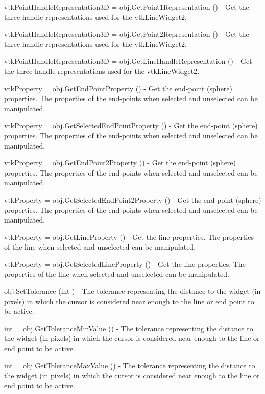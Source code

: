 \begin{DoxyItemize}
\item {\ttfamily vtk\-Point\-Handle\-Representation3\-D = obj.\-Get\-Point1\-Representation ()} -\/ Get the three handle representations used for the vtk\-Line\-Widget2.  
\item {\ttfamily vtk\-Point\-Handle\-Representation3\-D = obj.\-Get\-Point2\-Representation ()} -\/ Get the three handle representations used for the vtk\-Line\-Widget2.  
\item {\ttfamily vtk\-Point\-Handle\-Representation3\-D = obj.\-Get\-Line\-Handle\-Representation ()} -\/ Get the three handle representations used for the vtk\-Line\-Widget2.  
\item {\ttfamily vtk\-Property = obj.\-Get\-End\-Point\-Property ()} -\/ Get the end-\/point (sphere) properties. The properties of the end-\/points when selected and unselected can be manipulated.  
\item {\ttfamily vtk\-Property = obj.\-Get\-Selected\-End\-Point\-Property ()} -\/ Get the end-\/point (sphere) properties. The properties of the end-\/points when selected and unselected can be manipulated.  
\item {\ttfamily vtk\-Property = obj.\-Get\-End\-Point2\-Property ()} -\/ Get the end-\/point (sphere) properties. The properties of the end-\/points when selected and unselected can be manipulated.  
\item {\ttfamily vtk\-Property = obj.\-Get\-Selected\-End\-Point2\-Property ()} -\/ Get the end-\/point (sphere) properties. The properties of the end-\/points when selected and unselected can be manipulated.  
\item {\ttfamily vtk\-Property = obj.\-Get\-Line\-Property ()} -\/ Get the line properties. The properties of the line when selected and unselected can be manipulated.  
\item {\ttfamily vtk\-Property = obj.\-Get\-Selected\-Line\-Property ()} -\/ Get the line properties. The properties of the line when selected and unselected can be manipulated.  
\item {\ttfamily obj.\-Set\-Tolerance (int )} -\/ The tolerance representing the distance to the widget (in pixels) in which the cursor is considered near enough to the line or end point to be active.  
\item {\ttfamily int = obj.\-Get\-Tolerance\-Min\-Value ()} -\/ The tolerance representing the distance to the widget (in pixels) in which the cursor is considered near enough to the line or end point to be active.  
\item {\ttfamily int = obj.\-Get\-Tolerance\-Max\-Value ()} -\/ The tolerance representing the distance to the widget (in pixels) in which the cursor is considered near enough to the line or end point to be active.  

\end{DoxyItemize}
